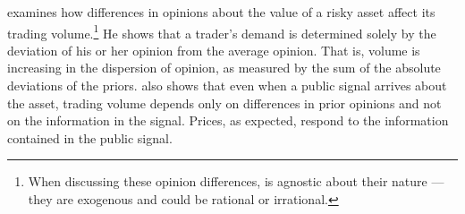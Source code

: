 \documentclass[
  12pt,
  a4paper,
  twoside,
  onecolumn]{article}
\begin{document}

\cite{varian1989} examines how differences in opinions about the value
of a risky asset affect its trading volume.\footnote{When discussing
  these opinion differences, \cite{varian1989} is agnostic about their
  nature --- they are exogenous and could be rational or irrational.} He
shows that a trader's demand is determined solely by the deviation of
his or her opinion from the average opinion. That is, volume is
increasing in the dispersion of opinion, as measured by the sum of the
absolute deviations of the priors. \cite{varian1989} also shows that
even when a public signal arrives about the asset, trading volume
depends only on differences in prior opinions and not on the information
in the signal. Prices, as expected, respond to the information contained
in the public signal.
\end{document}
